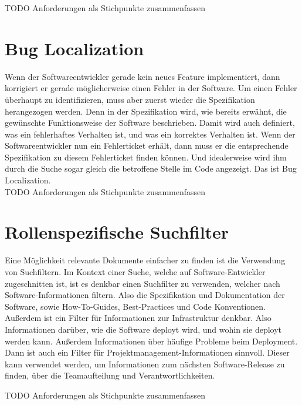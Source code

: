 TODO Anforderungen als Stichpunkte zusammenfassen

\section{Bug Localization}
Wenn der Softwareentwickler gerade kein neues Feature implementiert, dann korrigiert er gerade möglicherweise einen Fehler in der Software.
Um einen Fehler überhaupt zu identifizieren, muss aber zuerst wieder die Spezifikation herangezogen werden.
Denn in der Spezifikation wird, wie bereits erwähnt, die gewünschte Funktionsweise der Software beschrieben.
Damit wird auch definiert, was ein fehlerhaftes Verhalten ist, und was ein korrektes Verhalten ist.
Wenn der Softwareentwickler nun ein Fehlerticket erhält, dann muss er die entsprechende Spezifikation zu diesem Fehlerticket finden können.
Und idealerweise wird ihm durch die Suche sogar gleich die betroffene Stelle im Code angezeigt.
Das ist Bug Localization.\\

TODO Anforderungen als Stichpunkte zusammenfassen

\section{Rollenspezifische Suchfilter}
\label{chap:rollenspezifische-suchfilter}
Eine Möglichkeit relevante Dokumente einfacher zu finden ist die Verwendung von Suchfiltern.
Im Kontext einer Suche, welche auf Software-Entwickler zugeschnitten ist, ist es denkbar einen Suchfilter zu verwenden, welcher nach Software-Informationen filtern.
Also die Spezifikation und Dokumentation der Software, sowie How-To-Guides, Best-Practices und Code Konventionen.
Außerdem ist ein Filter für Informationen zur Infrastruktur denkbar. Also Informationen darüber, wie die Software deployt wird, und wohin sie deployt werden kann.
Außerdem Informationen über häufige Probleme beim Deployment.
Dann ist auch ein Filter für Projektmanagement-Informationen sinnvoll.
Dieser kann verwendet werden, um Informationen zum nächsten Software-Release zu finden, über die Teamaufteilung und Verantwortlichkeiten.

TODO Anforderungen als Stichpunkte zusammenfassen

